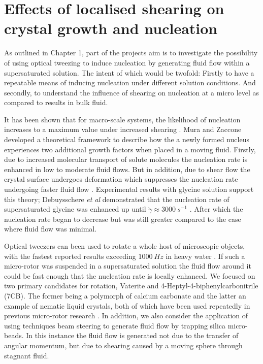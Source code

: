 \chapter{Effects of localised shearing on crystal growth and nucleation}
As outlined in Chapter 1, part of the projects aim is to investigate 
the possibility of using optical tweezing to induce nucleation by 
generating fluid flow within a supersaturated solution. The intent 
of which would be twofold: Firstly to have a repeatable means of 
inducing nucleation under different solution conditions. And secondly, 
to understand the influence of shearing on nucleation at a micro 
level as compared to results in bulk fluid. 

It has been shown that for macro-scale systems, the likelihood of 
nucleation increases to a maximum value under increased shearing 
\cite{Debuysschere2023, Mura2016}. Mura and Zaccone developed a 
theoretical framework to describe how the a newly formed nucleus 
experiences two additional growth factors when placed in a moving 
fluid. Firstly, due to increased molecular transport of solute 
molecules the nucleation rate is enhanced in low to moderate fluid 
flows. But in addition, due to shear flow the crystal surface 
undergoes deformation which suppresses the nucleation rate 
undergoing faster fluid flow \cite{Mura2016}. Experimental results 
with glycine solution support this theory; Debuysschere \textit{et 
al} demonstrated that the nucleation rate of supersaturated glycine 
was enhanced up until $\dot{\gamma}\approx3000\ s^{-1}$ 
\cite{Debuysschere2023}. After which the nucleation rate began to 
decrease but was still greater compared to the case where fluid 
flow was minimal.

Optical tweezers can been used to rotate a whole host of microscopic 
objects, with the fastest reported results exceeding $1000\ Hz$ in 
heavy water \cite{Arita2016}. If such a micro-rotor was suspended in
a supersaturated solution the fluid flow around it could be fast enough
that the nucleation rate is locally enhanced. We focused on two 
primary candidates for rotation, Vaterite and 
4-Heptyl-4-biphenylcarbonitrile (7CB). The former being a polymorph of 
calcium carbonate and the latter an example of nematic liquid crystals, 
both of which have been used repeatedly in previous micro-rotor research
\cite{Saito2022, Arita2016, Parkin2009}. In addition, we also consider 
the application of using techniques beam steering to generate fluid 
flow by trapping silica micro-beads. In this instance the fluid flow is 
generated not due to the transfer of angular momentum, but due to 
shearing caused by a moving sphere through stagnant fluid.

